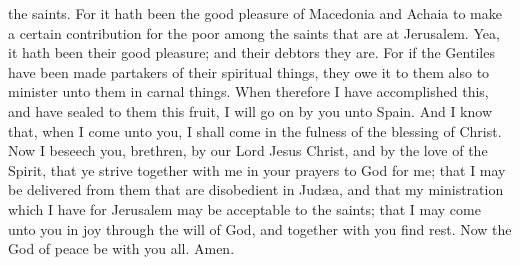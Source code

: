 the saints. For it hath been the good pleasure of Macedonia and Achaia to make a certain contribution for the poor among the saints that are at Jerusalem. Yea, it hath been their good pleasure; and their debtors they are. For if the Gentiles have been made partakers of their spiritual things, they owe it to them also to minister unto them in carnal things. When therefore I have accomplished this, and have sealed to them this fruit, I will go on by you unto Spain. And I know that, when I come unto you, I shall come in the fulness of the blessing of Christ.  Now I beseech you, brethren, by our Lord Jesus Christ, and by the love of the Spirit, that ye strive together with me in your prayers to God for me; that I may be delivered from them that are disobedient in Judæa, and that my ministration which I have for Jerusalem may be acceptable to the saints; that I may come unto you in joy through the will of God, and together with you find rest. Now the God of peace be with you all. Amen. 

